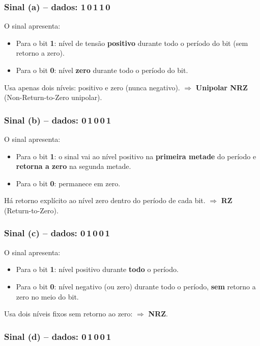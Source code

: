 \documentclass[12pt,a4paper]{article}
\begin{document}
\subsubsection*{Sinal (a) -- dados: 1\,0\,1\,1\,0}

O sinal apresenta:
\begin{itemize}
    \item Para o bit \textbf{1}: nível de tensão \textbf{positivo} durante todo o período do bit (sem retorno a zero).
    \item Para o bit \textbf{0}: nível \textbf{zero} durante todo o período do bit.
\end{itemize}
Usa apenas dois níveis: positivo e zero (nunca negativo).
$\Rightarrow$ \textbf{Unipolar NRZ} (Non-Return-to-Zero unipolar).

\subsubsection*{Sinal (b) -- dados: 0\,1\,0\,0\,1}

O sinal apresenta:
\begin{itemize}
    \item Para o bit \textbf{1}: o sinal vai ao nível positivo na \textbf{primeira metade} do período e \textbf{retorna a zero} na segunda metade.
    \item Para o bit \textbf{0}: permanece em zero.
\end{itemize}
Há retorno explícito ao nível zero dentro do período de cada bit.
$\Rightarrow$ \textbf{RZ} (Return-to-Zero).

\subsubsection*{Sinal (c) -- dados: 0\,1\,0\,0\,1}

O sinal apresenta:
\begin{itemize}
    \item Para o bit \textbf{1}: nível positivo durante \textbf{todo} o período.
    \item Para o bit \textbf{0}: nível negativo (ou zero) durante todo o período, \textbf{sem} retorno a zero no meio do bit.
\end{itemize}
Usa dois níveis fixos sem retorno ao zero: $\Rightarrow$ \textbf{NRZ}.

\subsubsection*{Sinal (d) -- dados: 0\,1\,0\,0\,1}
\end{document}
